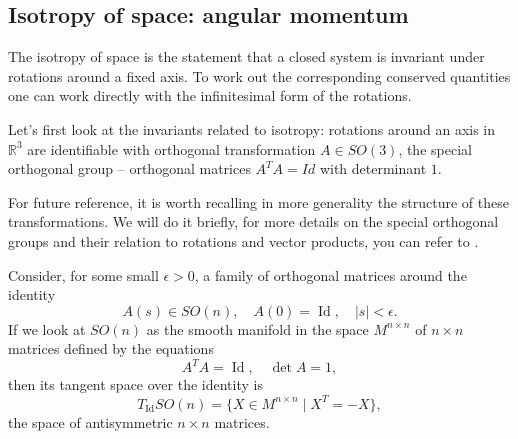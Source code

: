 \documentclass[english,fontsize=11pt,paper=a5,oneside]{scrbook}
\newcommand{\R}{\mathbb{R}}
\DeclareMathOperator{\Id}{Id}
\theoremstyle{definition}
\begin{document}
\subsection{Isotropy of space: angular momentum}\label{sec:angm}

The isotropy of space is the statement that a closed system is invariant under rotations around a fixed axis. To work out the corresponding conserved quantities one can work directly with the infinitesimal form of the rotations.

Let's first look at the invariants related to isotropy:
rotations around an axis in $\R^3$ are identifiable with orthogonal transformation $A\in SO(3)$, the special orthogonal group -- orthogonal matrices $A^TA = Id$ with determinant $1$.

For future reference, it is worth recalling in more generality the structure of these transformations. We will do it briefly, for more details on the special orthogonal groups and their relation to rotations and vector products, you can refer to \cite{book:marsdenratiu}.

Consider, for some small $\epsilon > 0$, a family of orthogonal matrices around the identity
\begin{equation}\label{eq:familyson}
  A(s) \in SO(n), \quad A(0) = \Id, \quad |s| < \epsilon.
\end{equation}
If we look at $SO(n)$ as the smooth manifold in the space $M^{n\times n}$ of $n\times n$ matrices defined by the equations
\begin{equation}
  A^T A = \Id,\quad \det A = 1,
\end{equation}
then its tangent space over the identity is
\begin{equation}
  T_{\Id} SO(n) = \big\{X\in M^{n\times n}\mid X^T = -X\big\},
\end{equation}
the space of antisymmetric $n\times n$ matrices.
\end{document}

